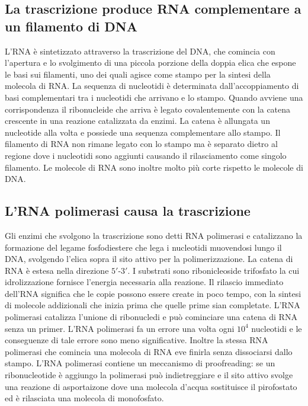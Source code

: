 \subsection{La trascrizione produce RNA complementare a un filamento di DNA}
L'RNA \`e sintetizzato attraverso la trascrizione del DNA, che comincia con l'apertura e lo svolgimento di una piccola porzione della doppia elica che espone le basi sui filamenti, uno
dei quali agisce come stampo per la sintesi della molecola di RNA. La sequenza di nucleotidi \`e determinata dall'accoppiamento di basi complementari tra i nucleotidi che arrivano e lo
stampo. Quando avviene una corrispondenza il ribonucleide che arriva \`e legato covalentemente con la catena crescente in una reazione catalizzata da enzimi. La catena \`e allungata un
nucleotide alla volta e possiede una sequenza complementare allo stampo. Il filamento di RNA non rimane legato con lo stampo ma \`e separato dietro al regione dove i nucleotidi sono
aggiunti causando il rilasciamento come singolo filamento. Le molecole di RNA sono inoltre molto pi\`u corte rispetto le molecole di DNA. 
\subsection{L'RNA polimerasi causa la trascrizione}
Gli enzimi che svolgono la trascrizione sono detti RNA polimerasi e catalizzano la formazione del legame fosfodiestere che lega i nucleotidi muovendosi lungo il DNA, svolgendo l'elica
sopra il sito attivo per la polimerizzazione. La catena di RNA \`e estesa nella direzione $5'$-$3'$. I substrati sono ribonicleoside trifosfato la cui idrolizzazione fornisce l'energia
necessaria alla reazione. Il rilascio immediato dell'RNA significa che le copie possono essere create in poco tempo, con la sintesi di molecole addizionali che inizia prima che quelle
prime sian completate. L'RNA polimerasi catalizza l'unione di ribonucledi e pu\`o cominciare una catena di RNA senza un primer. L'RNA polimerasi fa un errore una volta ogni $10^4$ 
nucleotidi e le conseguenze di tale errore sono meno significative. Inoltre la stessa RNA polimerasi che comincia una molecola di RNA eve finirla senza dissociarsi dallo stampo. L'RNA
polimerasi contiene un meccanismo di proofreading: se un ribonucleotide \`e aggiungo la polimerasi pu\`o indietreggiare e il sito attivo svolge una reazione di asportaizone dove una
molecola d'acqua sostituisce il pirofostato ed \`e rilasciata una molecola di monofosfato. 
